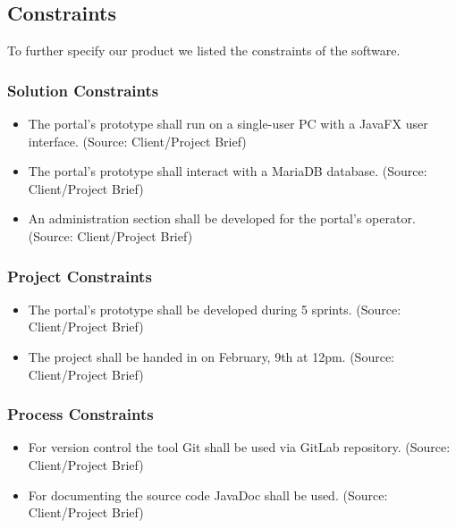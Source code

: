 \subsection{Constraints}
To further specify our product we listed the constraints of the software.
\subsubsection{Solution Constraints}
\begin{itemize}
    \item The portal's prototype shall run on a single-user PC with a JavaFX user interface. (Source: Client/Project Brief)
    \item The portal's prototype shall interact with a MariaDB database. (Source: Client/Project Brief)
    \item An administration section shall be developed for the portal's operator. (Source: Client/Project Brief)
\end{itemize}
\subsubsection{Project Constraints}
\begin{itemize}
    \item The portal's prototype shall be developed during 5 sprints. (Source: Client/Project Brief)
    \item The project shall be handed in on February, 9th at 12pm. (Source: Client/Project Brief)
\end{itemize}
\subsubsection{Process Constraints}
\begin{itemize}
    \item For version control the tool Git shall be used via GitLab repository. (Source: Client/Project Brief)
    \item For documenting the source code JavaDoc shall be used. (Source: Client/Project Brief)
\end{itemize}